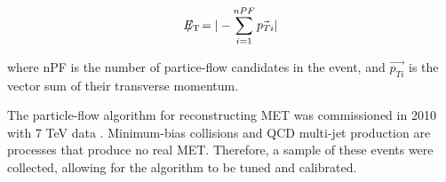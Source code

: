 \begin{equation}\label{eq:met}
E_{\mathrm{T}}\hspace{-1.1em}/\kern0.45em = | - \sum_{i=1}^{nPF} \vec{p_{Ti}} |
\end{equation}

\noindent where nPF is the number of partice-flow candidates in the
event, and $\vec{p_{Ti}}$ is the vector sum of their transverse
momentum.  

\par The particle-flow algorithm for reconstructing MET was commissioned
in 2010 with 7 TeV data \cite{CMS-PAS-PFT-10-002}.  Minimum-bias
collisions and QCD multi-jet production are processes that produce no
real MET.  Therefore, a sample of these events were collected,
allowing for the algorithm to be tuned and calibrated.  